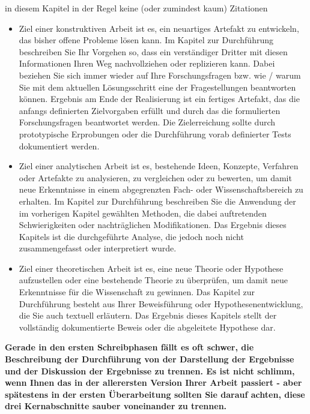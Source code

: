 \documentclass{article}
\begin{document}
in diesem Kapitel in der Regel keine (oder zumindest kaum) Zitationen

\begin{itemize}
    \item Ziel einer konstruktiven Arbeit ist es, ein neuartiges Artefakt zu entwickeln, das bisher offene Probleme lösen kann. 
Im Kapitel zur Durchführung beschreiben Sie Ihr Vorgehen so, dass ein verständiger Dritter mit diesen Informationen Ihren Weg nachvollziehen oder replizieren kann. Dabei beziehen Sie sich immer wieder auf Ihre Forschungsfragen bzw. wie / warum Sie mit dem aktuellen Lösungsschritt eine der Fragestellungen beantworten können. 
Ergebnis am Ende der Realisierung ist ein fertiges Artefakt, das die anfangs definierten Zielvorgaben erfüllt und durch das die formulierten Forschungsfragen beantwortet werden. Die Zielerreichung sollte durch prototypische Erprobungen oder die Durchführung vorab definierter Tests dokumentiert werden. 
    \item Ziel einer analytischen Arbeit ist es, bestehende Ideen, Konzepte, Verfahren oder Artefakte zu analysieren, zu vergleichen oder zu bewerten, um damit neue Erkenntnisse in einem abgegrenzten Fach- oder Wissenschaftsbereich zu erhalten.
Im Kapitel zur Durchführung beschreiben Sie die Anwendung der im vorherigen Kapitel gewählten Methoden, die dabei auftretenden Schwierigkeiten oder nachträglichen Modifikationen.
Das Ergebnis dieses Kapitels ist die durchgeführte Analyse, die jedoch noch nicht zusammengefasst oder interpretiert wurde.
    \item Ziel einer theoretischen Arbeit ist es, eine neue Theorie oder Hypothese aufzustellen oder eine bestehende Theorie zu überprüfen, um damit neue Erkenntnisse für die Wissenschaft zu gewinnen. 
Das Kapitel zur Durchführung besteht aus Ihrer Beweisführung oder Hypothesenentwicklung, die Sie auch textuell erläutern. 
Das Ergebnis dieses Kapitels stellt der vollständig dokumentierte Beweis oder die abgeleitete Hypothese dar. 
\end{itemize}

\textbf{Gerade in den ersten Schreibphasen fällt es oft schwer, die Beschreibung der Durchführung von der Darstellung der Ergebnisse und der Diskussion der Ergebnisse zu trennen. Es ist nicht schlimm, wenn Ihnen das in der allerersten Version Ihrer Arbeit passiert - aber spätestens in der ersten Überarbeitung sollten Sie darauf achten, diese drei Kernabschnitte sauber voneinander zu trennen.}
\\
\end{document}

